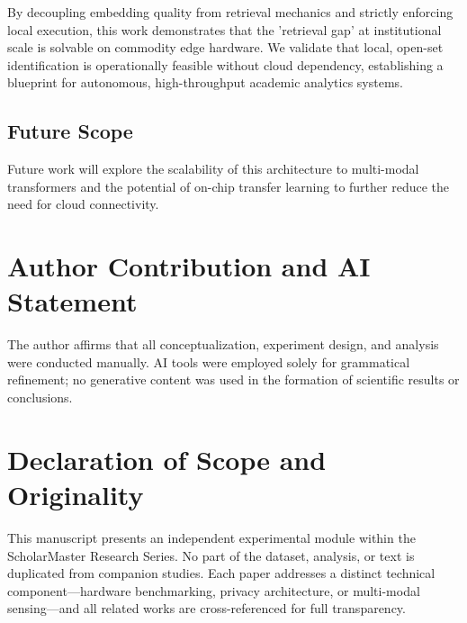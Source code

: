 \documentclass[conference]{IEEEtran}
\begin{document}
By decoupling embedding quality from retrieval mechanics and strictly enforcing local execution, this work demonstrates that the 'retrieval gap' at institutional scale is solvable on commodity edge hardware. We validate that local, open-set identification is operationally feasible without cloud dependency, establishing a blueprint for autonomous, high-throughput academic analytics systems.

\subsection{Future Scope}
Future work will explore the scalability of this architecture to multi-modal transformers and the potential of on-chip transfer learning to further reduce the need for cloud connectivity.

\section*{Author Contribution and AI Statement}
The author affirms that all conceptualization, experiment design, and analysis were conducted manually. AI tools were employed solely for grammatical refinement; no generative content was used in the formation of scientific results or conclusions.

\section*{Declaration of Scope and Originality}
This manuscript presents an independent experimental module within the ScholarMaster Research Series. 
No part of the dataset, analysis, or text is duplicated from companion studies. 
Each paper addresses a distinct technical component—hardware benchmarking, privacy architecture, or multi-modal sensing—and all related works are cross-referenced for full transparency.
\end{document}
